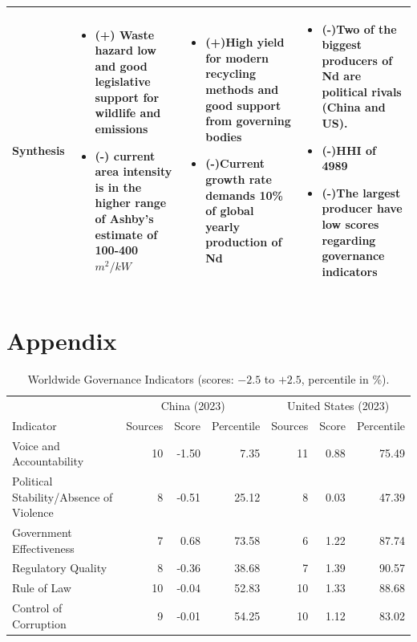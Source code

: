 \documentclass[11pt]{article}
\begin{document}
\begin{table}[h]
\begin{tabular}{p{} p{} p{} p{}}
\textbf{Synthesis} &
\begin{itemize}[label={}]
  \item (+) Waste hazard low and good legislative support for wildlife and emissions
  \item (-) current area intensity is in the higher range of Ashby's estimate of 100-400 $m^2/kW$
\end{itemize}
&
\begin{itemize}[label={}]
  \item (+)High yield for modern recycling methods and good support from governing bodies
  \item (-)Current growth rate demands 10\% of global yearly production of Nd
\end{itemize}
&
\begin{itemize}[label={}]
  \item (-)Two of the biggest producers of Nd are political rivals (China and US).
  \item (-)HHI of 4989
  \item (-)The largest producer have low scores regarding governance indicators
\end{itemize}


\\
\hline
\end{tabular}
\end{table}



\newpage
\section*{Appendix}
\begin{table}[h]
\centering
\small
\caption{Worldwide Governance Indicators (scores: $-2.5$ to $+2.5$, percentile in \%).}
\begin{tabular}{lrrrrrr}
\hline
 & \multicolumn{3}{c}{China (2023)} & \multicolumn{3}{c}{United States (2023)} \\
Indicator & Sources & Score & Percentile & Sources & Score & Percentile \\
\hline
Voice and Accountability                 & 10 & -1.50 & 7.35  & 11 & 0.88 & 75.49 \\
Political Stability/Absence of Violence  &  8 & -0.51 & 25.12 &  8 & 0.03 & 47.39 \\
Government Effectiveness                 &  7 &  0.68 & 73.58 &  6 & 1.22 & 87.74 \\
Regulatory Quality                       &  8 & -0.36 & 38.68 &  7 & 1.39 & 90.57 \\
Rule of Law                              & 10 & -0.04 & 52.83 & 10 & 1.33 & 88.68 \\
Control of Corruption                    &  9 & -0.01 & 54.25 & 10 & 1.12 & 83.02 \\
\hline
\end{tabular}
\end{table}
\end{document}
